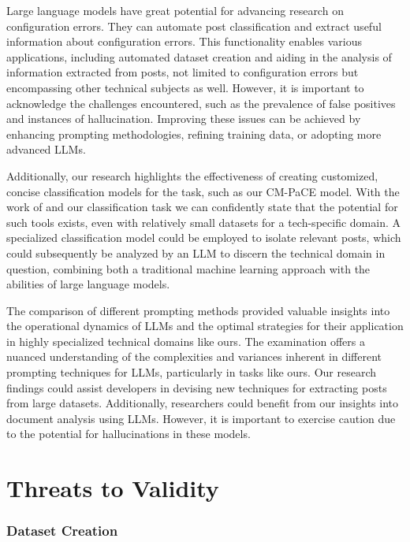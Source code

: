 \documentclass[english,bachelor]{swsLeipzig}
\begin{document}
Large language models have great potential for advancing research on configuration errors. They 
can automate post classification and extract useful information about configuration errors. This functionality enables various applications, including automated dataset creation and aiding in the analysis of information extracted from posts, not limited to configuration errors but encompassing other technical subjects as well. However, it is important to acknowledge the challenges encountered, such as the prevalence of false positives and instances of hallucination. Improving these issues can be achieved by enhancing prompting methodologies, refining training data, or adopting more advanced LLMs.

Additionally, our research highlights the effectiveness of creating customized, concise classification 
models for the task, such as our CM-PaCE model. With the work of \citet{tian:2020} and our classification task we can confidently state that the potential for such tools exists, even with relatively small datasets for a tech-specific domain. A specialized classification model could be employed to isolate relevant posts, which could subsequently be analyzed by an LLM to discern the technical domain in question, combining both a traditional machine learning approach with the abilities of large language models.

The comparison of different prompting methods provided valuable insights into the operational dynamics 
of LLMs and the optimal strategies for their application in highly specialized technical domains like ours. The examination offers a nuanced understanding of the complexities and variances inherent in different prompting techniques for LLMs, particularly in tasks like ours. Our research findings could assist developers in devising new techniques for extracting posts from large datasets. Additionally, researchers could benefit from our insights into document analysis using LLMs. However, it is important to exercise caution due to the potential for hallucinations in these models.

\section{Threats to Validity}

\subsubsection{Dataset Creation}
\end{document}
